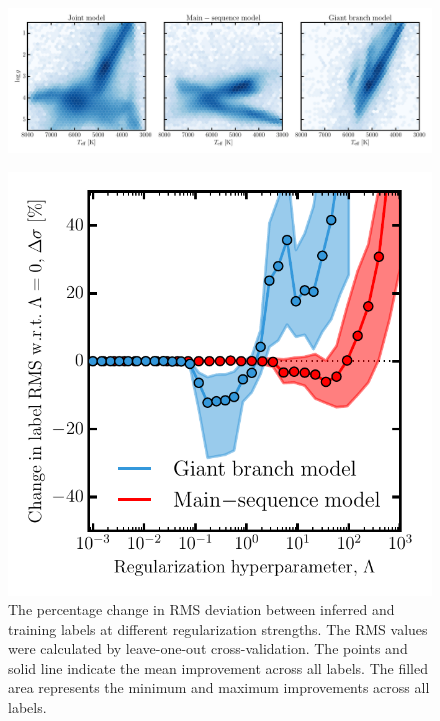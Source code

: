 \documentclass[preprint,trackchanges]{aastex}
\begin{document}
\begin{figure}[p]
\includegraphics[width=\textwidth]{figures/test-set-density.pdf}
\caption{\label{fig:test-set-density}}
\end{figure}


\begin{figure}[p]
\includegraphics[width=\textwidth]{figures/set-hyperparameters.pdf}
\caption{The percentage change in RMS deviation between inferred and training labels at different regularization strengths.  The RMS values were calculated by leave-one-out cross-validation.  The points and solid line indicate the mean improvement across all labels. The filled area represents the minimum and maximum improvements across all labels.\label{fig:set-hyperparameters}}
\end{figure}
\end{document}
